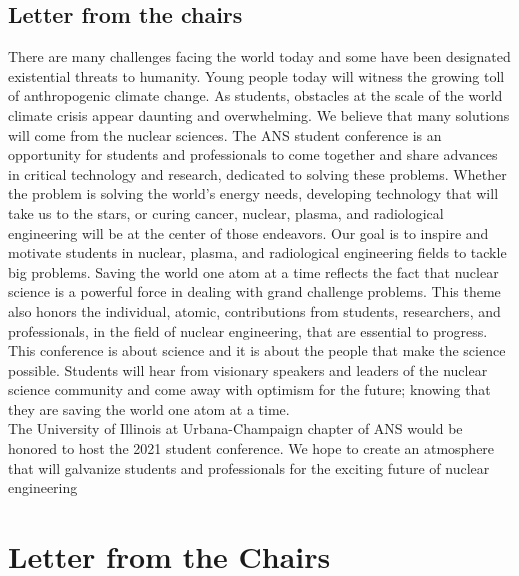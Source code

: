 \documentclass[12pt, letterpaper]{article}
\begin{document}
\subsection{Letter from the chairs}
There are many challenges facing the world today and some have been designated existential threats to humanity. Young people today will witness the growing toll of anthropogenic climate change. As students, obstacles at the scale of the world climate crisis appear daunting and overwhelming. We believe that many solutions will come from the nuclear sciences. The ANS student conference is an opportunity for students and professionals to come together and share advances in critical technology and research, dedicated to solving these problems. Whether the problem is solving the world’s energy needs, developing technology that will take us to the stars, or curing cancer, nuclear, plasma, and radiological engineering will be at the center of those endeavors. Our goal is to inspire and motivate students in nuclear, plasma, and radiological engineering fields to tackle big problems. Saving the world one atom at a time reflects the fact that nuclear science is a powerful force in dealing with grand challenge problems. This theme also honors the individual, atomic, contributions from students, researchers, and professionals, in the field of nuclear engineering, that are essential to progress. This conference is about science and it is about the people that make the science possible. Students will hear from visionary speakers and leaders of the nuclear science community and come away with optimism for the future; knowing that they are saving the world one atom at a time.\\
The University of Illinois at Urbana-Champaign chapter of ANS would be honored to host the 2021 student conference. We hope to create an atmosphere that will galvanize students and professionals for the exciting future of nuclear engineering


\newpage
\section{Letter from the Chairs}


\end{document}
